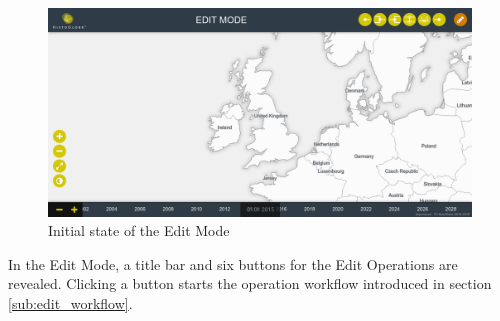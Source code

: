 \begin{minipage}[t]{0.47\textwidth}

  \begin{figure}[H]
    \centering
    \includegraphics[width=1.0\textwidth]{graphics/development/user_interface_design_process/2_edit_mode.png}
    \caption{Initial state of the Edit Mode}
    \label{fig:final_2_edit_mode}
  \end{figure}

  In the Edit Mode, a title bar and six buttons for the Edit Operations are   revealed. Clicking a button starts the operation workflow introduced in section \ref{sub:edit_workflow}.

\end{minipage}

